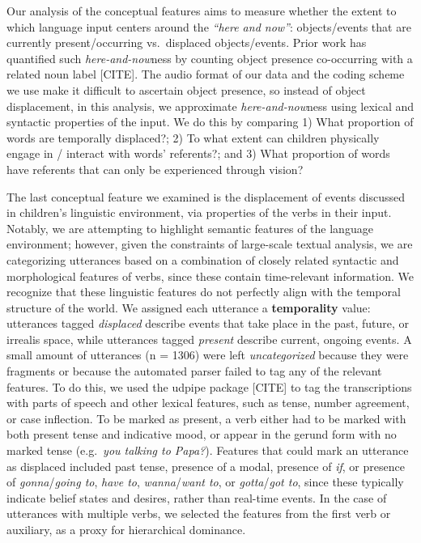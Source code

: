 \documentclass[
  man,floatsintext]{apa6}
\begin{document}
Our analysis of the conceptual features aims to measure whether the extent to which language input centers around the \emph{``here and now''}: objects/events that are currently present/occurring vs.~displaced objects/events. Prior work has quantified such \emph{here-and-now}ness by counting object presence co-occurring with a related noun label {[}CITE{]}. The audio format of our data and the coding scheme we use make it difficult to ascertain object presence, so instead of object displacement, in this analysis, we approximate \emph{here-and-now}ness using lexical and syntactic properties of the input. We do this by comparing 1) What proportion of words are temporally displaced?; 2) To what extent can children physically engage in / interact with words' referents?; and 3) What proportion of words have referents that can only be experienced through vision?

The last conceptual feature we examined is the displacement of events discussed in children's linguistic environment, via properties of the verbs in their input. Notably, we are attempting to highlight semantic features of the language environment; however, given the constraints of large-scale textual analysis, we are categorizing utterances based on a combination of closely related syntactic and morphological features of verbs, since these contain time-relevant information. We recognize that these linguistic features do not perfectly align with the temporal structure of the world. We assigned each utterance a \textbf{temporality} value: utterances tagged \emph{displaced} describe events that take place in the past, future, or irrealis space, while utterances tagged \emph{present} describe current, ongoing events. A small amount of utterances (n = 1306) were left \emph{uncategorized} because they were fragments or because the automated parser failed to tag any of the relevant features. To do this, we used the udpipe package {[}CITE{]} to tag the transcriptions with parts of speech and other lexical features, such as tense, number agreement, or case inflection. To be marked as present, a verb either had to be marked with both present tense and indicative mood, or appear in the gerund form with no marked tense (e.g.~\emph{you talking to Papa?}). Features that could mark an utterance as displaced included past tense, presence of a modal, presence of \emph{if}, or presence of \emph{gonna}/\emph{going to}, \emph{have to}, \emph{wanna}/\emph{want to}, or \emph{gotta}/\emph{got to}, since these typically indicate belief states and desires, rather than real-time events. In the case of utterances with multiple verbs, we selected the features from the first verb or auxiliary, as a proxy for hierarchical dominance.
\end{document}
